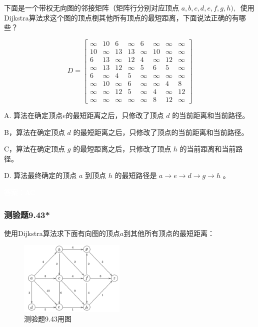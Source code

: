\documentclass[UTF8, heading=true]{ctexart}
\begin{document}
下面是一个带权无向图的邻接矩阵（矩阵行分别对应顶点 $a, b, c, d, e, f, g, h), ~$ 使用Dijkstra算法求这个图的顶点椡其他所有顶点的最短距离，下面说法正确的有哪些？
\begin{table}[H]
  \renewcommand{\arraystretch}{1.3}
$$D=\left[\begin{array}{cccccccc}\infty & 10 & 6 & \infty & 6 & \infty & \infty & \infty \\ 10 & \infty & 13 & 13 & \infty & 10 & \infty & \infty \\ 6 & 13 & \infty & 12 & 4 & \infty & 12 & \infty \\ \infty & 13 & 12 & \infty & 5 & 6 & 5 & \infty \\ 6 & \infty & 4 & 5 & \infty & \infty & \infty & \infty \\ \infty & 10 & \infty & 6 & \infty & \infty & 4 & 8 \\ \infty & \infty & 12 & 5 & \infty & 4 & \infty & 12 \\ \infty & \infty & \infty & \infty & \infty & 8 & 12 & \infty\end{array}\right]$$
\end{table}

A. 算法在确定顶点$e$的最短距离之后，只修改了顶点 $d$ 的当前距离和当前路径。

B，算法在确定顶点 $d$ 的最短距离之后，只修改了顶点的当前距离和当前路径。

C，算法在确定顶点 $g$ 的最短距离之后，只修改了顶点 $h$ 的当前距离和当前路径。

D.  算法最终确定的顶点 $a$ 到顶点 $h$ 的最短路径是 $a \rightarrow e \rightarrow d \rightarrow g \rightarrow h$ 。


\textcolor{white}{答案：AC}

\subsubsection{测验题9.43*}

使用Dijkstra算法求下面有向图的顶点$a$到其他所有顶点的最短距离：

\begin{figure}[H]
  \centering
  \includegraphics[width=0.45\textwidth]{9.43.jpg} %
  \caption{测验题9.43用图}
\end{figure}
\end{document}
